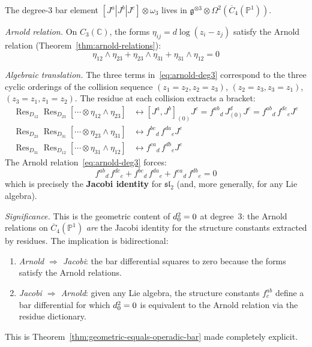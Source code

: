 \begin{computation}
\label{comp:geom-alg-comparison-deg3}

The degree-3 bar element
$[J^a|J^b|J^c] \otimes \omega_3$
lives in $\mathfrak{g}^{\otimes 3} \otimes
\Omega^2(\overline{C}_4(\mathbb{P}^1))$.

\emph{Arnold relation.}
On $C_3(\mathbb{C})$, the forms $\eta_{ij} = d\log(z_i - z_j)$
satisfy the Arnold relation
(Theorem~\ref{thm:arnold-relations}):
\begin{equation}\label{eq:arnold-deg3}
\eta_{12} \wedge \eta_{23} + \eta_{23} \wedge \eta_{31}
+ \eta_{31} \wedge \eta_{12} = 0
\end{equation}

\emph{Algebraic translation.}
The three terms in~\eqref{eq:arnold-deg3} correspond to the three
cyclic orderings of the collision sequence
$(z_1 = z_2, z_2 = z_3)$, $(z_2 = z_3, z_3 = z_1)$,
$(z_3 = z_1, z_1 = z_2)$.
The residue at each collision extracts a bracket:
\begin{align}
\operatorname{Res}_{D_{12}}\operatorname{Res}_{D_{23}}
[\cdots \otimes \eta_{12} \wedge \eta_{23}]
&\leftrightarrow [J^a, J^b]_{(0)} J^c
= {f^{ab}}_d\, J^d_{(0)} J^c
= {f^{ab}}_d\, {f^{dc}}_e J^e \\
\operatorname{Res}_{D_{23}}\operatorname{Res}_{D_{31}}
[\cdots \otimes \eta_{23} \wedge \eta_{31}]
&\leftrightarrow {f^{bc}}_d\, {f^{da}}_e J^e \\
\operatorname{Res}_{D_{31}}\operatorname{Res}_{D_{12}}
[\cdots \otimes \eta_{31} \wedge \eta_{12}]
&\leftrightarrow {f^{ca}}_d\, {f^{db}}_e J^e
\end{align}
The Arnold relation~\eqref{eq:arnold-deg3} forces:
\begin{equation}\label{eq:jacobi-from-arnold}
{f^{ab}}_d\, {f^{dc}}_e + {f^{bc}}_d\, {f^{da}}_e
+ {f^{ca}}_d\, {f^{db}}_e = 0
\end{equation}
which is precisely the \textbf{Jacobi identity} for
$\mathfrak{sl}_2$ (and, more generally, for any Lie algebra).

\emph{Significance.}
This is the geometric content of $d_0^2 = 0$ at degree~3:
the Arnold relations on
$\overline{C}_4(\mathbb{P}^1)$ \emph{are} the Jacobi identity
for the structure constants extracted by residues.  The
implication is bidirectional:
\begin{enumerate}
\item \emph{Arnold $\Rightarrow$ Jacobi}: the bar differential
  squares to zero because the forms satisfy the Arnold relations.
\item \emph{Jacobi $\Rightarrow$ Arnold}: given any Lie algebra,
  the structure constants $f^{ab}_c$ define a bar differential
  for which $d_0^2 = 0$ is equivalent to the Arnold relation via
  the residue dictionary.
\end{enumerate}
This is Theorem~\ref{thm:geometric-equals-operadic-bar} made
completely explicit.
\end{computation}


